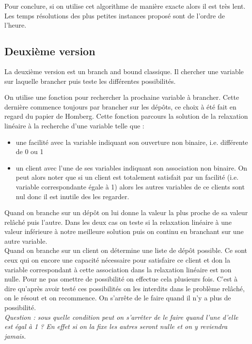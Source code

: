 \documentclass[12pt,a4paper]{article}
\begin{document}
Pour conclure, si on utilise cet algorithme de manière exacte alors il est très lent. Les temps résolutions des plus petites instances proposé sont de l'ordre de l'heure.\\
 
\subsection{Deuxième version}

La deuxième version est un branch and bound classique. Il chercher une variable sur laquelle brancher puis teste les différentes possibilités.

On utilise une fonction pour rechercher la prochaine variable à brancher. Cette dernière commence toujours par brancher sur les dépôts, ce choix à été fait en regard du papier de Homberg. Cette fonction parcours la solution de la relaxation linéaire à la recherche d'une variable telle que :
\begin{itemize}
\item
une facilité avec la variable indiquant son ouverture non binaire, i.e. différente de 0 ou 1
\item
un client avec l'une de ses variables indiquant son association non binaire. On peut alors noter que si un client est totalement satisfait par un facilité (i.e. variable correspondante égale à 1) alors les autres variables de ce clients sont nul donc il est inutile des les regarder.
\end{itemize}

Quand on branche sur un dépôt on lui donne la valeur la plus proche de sa valeur relâché puis l'autre. Dans les deux cas on teste si la relaxation linéaire à une valeur inférieure à notre meilleure solution puis on continu en branchant sur une autre variable.\\

Quand on branche sur un client on détermine une liste de dépôt possible. Ce sont ceux qui on encore une capacité nécessaire pour satisfaire ce client et don la variable correspondant à cette association dans la relaxation linéaire est non nulle. Pour ne pas omettre de possibilité on effectue cela plusieurs fois. C'est à dire qu'après avoir testé ces possibilités on les interdits dans le problème relâché, on le résout et on recommence. On s’arrête de le faire quand il n'y a plus de possibilité.\\
\textit{Question : sous quelle condition peut on s’arrêter de le faire quand l'une d'elle est égal à 1 ? En effet si on la fixe les autres seront nulle et on y reviendra jamais.} \\
\end{document}
